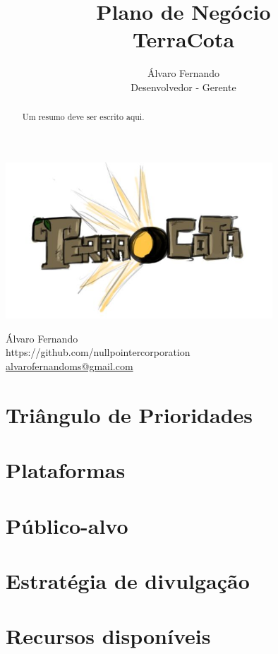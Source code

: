 \documentclass[a4paper,11pt]{article}
\title{Plano de Negócio\\TerraCota}
\author{Álvaro Fernando\\Desenvolvedor - Gerente}
\begin{document}
\begin{titlepage}
    \centering
    \maketitle
    \thispagestyle{empty}   %
    \includegraphics[width=10cm]{logo_inicial.jpg}
    \vfill
    {\raggedright
    Álvaro Fernando\\
    https://github.com/nullpointercorporation\\
    \href{mailto:alvarofernandoms@gmail.com}{alvarofernandoms@gmail.com}\\
    }
\end{titlepage}

\begin{abstract}
Um resumo deve ser escrito aqui.
\end{abstract}

\pagebreak
\tableofcontents
\pagebreak

\section{Triângulo de Prioridades}

\section{Plataformas}

\section{Público-alvo}

\section{Estratégia de divulgação}

\section{Recursos disponíveis}
\end{document}
